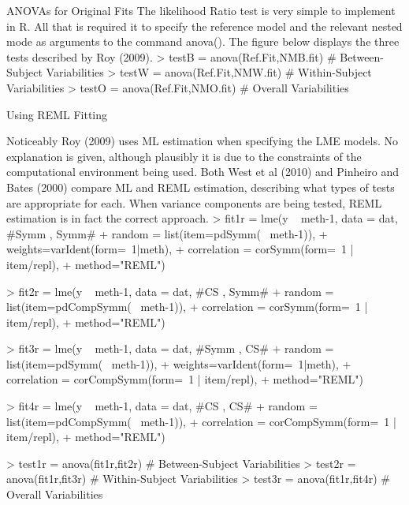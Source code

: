 ANOVAs  for  Original Fits
The likelihood Ratio test is very simple to implement in R. All that is required it to specify the reference model and the relevant nested mode as arguments to the command anova().
The figure below displays the three tests described by Roy (2009).
> testB    = anova(Ref.Fit,NMB.fit)                        # Between-Subject Variabilities
> testW   = anova(Ref.Fit,NMW.fit)                        # Within-Subject Variabilities
> testO     = anova(Ref.Fit,NMO.fit)                        # Overall Variabilities

  
 


 


Using REML Fitting

Noticeably Roy (2009) uses ML estimation when specifying the LME models. No explanation is given, although plausibly it is due to the constraints of the computational environment being used.
Both West et al (2010) and Pinheiro and Bates (2000) compare ML and REML estimation, describing what types of tests are appropriate for each.  When variance components are being tested, REML estimation is in fact the correct approach.
> fit1r = lme(y ~ meth-1, data = dat,   #Symm , Symm#
+     random = list(item=pdSymm(~ meth-1)), 
+     weights=varIdent(form=~1|meth),
+     correlation = corSymm(form=~1 | item/repl), 
+     method="REML")

     
 


> fit2r = lme(y ~ meth-1, data = dat,   #CS , Symm#
+     random = list(item=pdCompSymm(~ meth-1)),
+     correlation = corSymm(form=~1 | item/repl), 
+     method="REML")



  
> fit3r = lme(y ~ meth-1, data = dat,   #Symm , CS# 
+     random = list(item=pdSymm(~ meth-1)),
+     weights=varIdent(form=~1|meth), 
+     correlation = corCompSymm(form=~1 | item/repl), 
+     method="REML")



> fit4r = lme(y ~ meth-1, data = dat,   #CS , CS# 
+     random = list(item=pdCompSymm(~ meth-1)), 
+     correlation = corCompSymm(form=~1 | item/repl), 
+     method="REML")



> test1r = anova(fit1r,fit2r)                     # Between-Subject Variabilities
> test2r = anova(fit1r,fit3r)                    # Within-Subject Variabilities
> test3r = anova(fit1r,fit4r)                    # Overall Variabilities   



